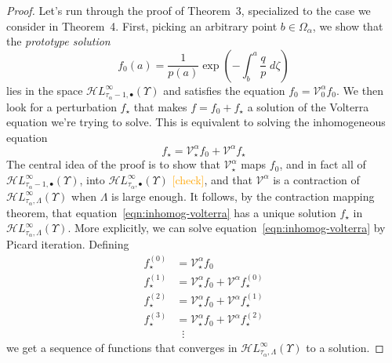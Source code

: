 \documentclass{article}
\newcommand{\singexp}[2]{\mathcal{H}L^\infty_{#1, #2}}
\newcommand{\singexpalg}[1]{\singexp{#1}{\bullet}}
\newcommand{\volterra}{\mathcal{V}}
\newcommand{\hardpart}{\mathcal{V}_0}
\newcommand{\softpart}{\mathcal{V}_\star}
\newcommand{\solwhole}{f}
\newcommand{\solproto}{f_0}
\newcommand{\solptb}{f_\star}
\theoremstyle{definition}
\theoremstyle{plain}
\begin{document}
\begin{proof}
Let's run through the proof of Theorem~3, specialized to the case we consider in Theorem~4. First, picking an arbitrary point $b \in \Omega_\alpha$, we show that the {\em prototype solution}
\[ \solproto(a) = \frac{1}{p(a)} \exp\left(-\int_{b}^{a}\frac{q}{p}\;d\zeta\right) \]
lies in the space $\singexpalg{\tau_\alpha - 1}(\Upsilon)$ and satisfies the equation $\solproto = \hardpart^\alpha \solproto$. We then look for a perturbation $\solptb$ that makes $\solwhole = \solproto + \solptb$ a solution of the Volterra equation we're trying to solve. This is equivalent to solving the inhomogeneous equation
\begin{equation}\label{eqn:inhomog-volterra}
\solptb = \softpart^\alpha \solproto + \volterra^\alpha \solptb
\end{equation}
The central idea of the proof is to show that $\softpart^\alpha$ maps $\solproto$, and in fact all of $\singexpalg{\tau_\alpha - 1}(\Upsilon)$, into $\singexpalg{\tau_\alpha}(\Upsilon)$ \textcolor{orange}{[check]}, and that $\volterra^\alpha$ is a contraction of $\singexp{\tau_\alpha}{\Lambda}(\Upsilon)$ when $\Lambda$ is large enough. It follows, by the contraction mapping theorem, that equation~\eqref{eqn:inhomog-volterra} has a unique solution $\solptb$ in $\singexp{\tau_\alpha}{\Lambda}(\Upsilon)$. More explicitly, we can solve equation~\eqref{eqn:inhomog-volterra} by Picard iteration. Defining
\begin{align*}
\solptb^{(0)} & = \softpart^\alpha \solproto \\
\solptb^{(1)} & = \softpart^\alpha \solproto + \volterra^\alpha \solptb^{(0)} \\
\solptb^{(2)} & = \softpart^\alpha \solproto + \volterra^\alpha \solptb^{(1)} \\
\solptb^{(3)} & = \softpart^\alpha \solproto + \volterra^\alpha \solptb^{(2)} \\
& \;\;\vdots
\end{align*}
we get a sequence of functions that converges in $\singexp{\tau_\alpha}{\Lambda}(\Upsilon)$ to a solution.


\end{proof}
\end{document}
